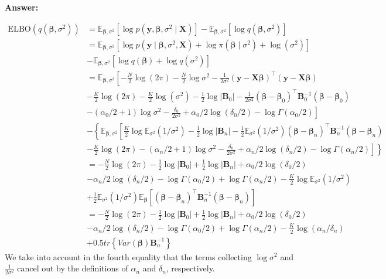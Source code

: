 \begin{enumerate}[leftmargin=*]
\textbf{Answer:}

\begin{align*}
	\text{ELBO}(q(\boldsymbol{\beta},\sigma^2))&=\mathbb{E}_{\boldsymbol{\beta},\sigma^2}[\log p(\boldsymbol{y},\boldsymbol{\beta},\sigma^2\mid\boldsymbol{X})]-\mathbb{E}_{\boldsymbol{\beta},\sigma^2}[\log q(\boldsymbol{\beta},\sigma^2)]\\
	&=\mathbb{E}_{\boldsymbol{\beta},\sigma^2}[\log p(\boldsymbol{y}\mid\boldsymbol{\beta},\sigma^2,\boldsymbol{X})+\log \pi(\boldsymbol{\beta}\mid\sigma^2)+\log(\sigma^2)]\\
	&-\mathbb{E}_{\boldsymbol{\beta},\sigma^2}[\log q(\boldsymbol{\beta}) + \log q(\sigma^2)]\\
	&=\mathbb{E}_{\boldsymbol{\beta},\sigma^2}\left[-\frac{N}{2}\log (2\pi)-\frac{N}{2}\log\sigma^2 - \frac{1}{2\sigma^2}(\boldsymbol{y}-\boldsymbol{X}\boldsymbol{\beta})^{\top}(\boldsymbol{y}-\boldsymbol{X}\boldsymbol{\beta})\right.\\
	&\left.-\frac{K}{2}\log(2\pi)-\frac{K}{2}\log(\sigma^2)-\frac{1}{2}\log|\boldsymbol{B}_0|-\frac{1}{2\sigma^2}(\boldsymbol{\beta}-\boldsymbol{\beta}_0)^{\top}\boldsymbol{B}_0^{-1}(\boldsymbol{\beta}-\boldsymbol{\beta}_0)\right.\\
	&-\left.(\alpha_0/2+1)\log\sigma^2-\frac{\delta_0}{2\sigma^2}+\alpha_0/2\log(\delta_0/2)-\log\Gamma(\alpha_0/2)\right]\\
	&-\left\{\mathbb{E}_{\boldsymbol{\beta},\sigma^2}\left[\frac{K}{2}\log\mathbb{E}_{{\sigma^2}}(1/\sigma^2)-\frac{1}{2}\log|\boldsymbol{B}_n|-\frac{1}{2}\mathbb{E}_{{\sigma^2}}(1/\sigma^2)(\boldsymbol{\beta}-\boldsymbol{\beta}_n)^{\top}\boldsymbol{B}_n^{-1}(\boldsymbol{\beta}-\boldsymbol{\beta}_n)\right.\right.\\
	&\left.\left.-\frac{K}{2}\log(2\pi)-(\alpha_n/2+1)\log\sigma^2-\frac{\delta_n}{2\sigma^2}+\alpha_n/2\log(\delta_n/2)-\log\Gamma(\alpha_n/2)\right]\right\}\\
	&=-\frac{N}{2}\log (2\pi)-\frac{1}{2}\log|\boldsymbol{B}_0|+\frac{1}{2}\log|\boldsymbol{B}_n|+\alpha_0/2\log(\delta_0/2)\\
	&-\alpha_n/2\log(\delta_n/2)-\log\Gamma(\alpha_0/2)+\log\Gamma(\alpha_n/2)-\frac{K}{2}\log\mathbb{E}_{{\sigma^2}}(1/\sigma^2)\\
	&+\frac{1}{2}\mathbb{E}_{{\sigma^2}}(1/\sigma^2)\mathbb{E}_{\boldsymbol{\beta}}\left[(\boldsymbol{\beta}-\boldsymbol{\beta}_n)^{\top}\boldsymbol{B}_n^{-1}(\boldsymbol{\beta}-\boldsymbol{\beta}_n)\right]\\
	&=-\frac{N}{2}\log (2\pi)-\frac{1}{2}\log|\boldsymbol{B}_0|+\frac{1}{2}\log|\boldsymbol{B}_n|+\alpha_0/2\log(\delta_0/2)\\
	&-\alpha_n/2\log(\delta_n/2)-\log\Gamma(\alpha_0/2)+\log\Gamma(\alpha_n/2)-\frac{K}{2}\log(\alpha_n/\delta_n)\\
	&+0.5tr\left\{Var(\boldsymbol{\beta})\boldsymbol{B}_n^{-1}\right\}
\end{align*}
We take into account in the fourth equality that the terms collecting $\log\sigma^2$ and $\frac{1}{2\sigma^2}$ cancel out by the definitions of $\alpha_n$ and $\delta_n$, respectively.


\end{enumerate}

